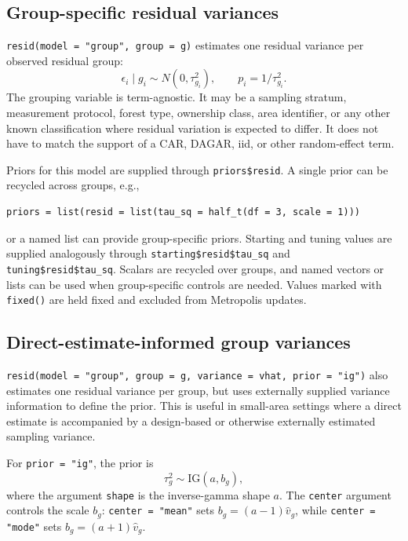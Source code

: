 \documentclass[11pt]{article}
\begin{document}
\subsection{Group-specific residual variances}

\texttt{resid(model = "group", group = g)} estimates one residual variance per observed residual group:
\begin{equation}
  \epsilon_i \mid g_i \sim N(0,\tau_{g_i}^2),
  \qquad p_i=1/\tau_{g_i}^2.
\end{equation}
The grouping variable is term-agnostic. It may be a sampling stratum, measurement protocol, forest type, ownership class, area identifier, or any other known classification where residual variation is expected to differ. It does not have to match the support of a CAR, DAGAR, iid, or other random-effect term.

Priors for this model are supplied through \texttt{priors\$resid}. A single prior can be recycled across groups, e.g.,
\begin{verbatim}
priors = list(resid = list(tau_sq = half_t(df = 3, scale = 1)))
\end{verbatim}
or a named list can provide group-specific priors. Starting and tuning values are supplied analogously through \texttt{starting\$resid\$tau\_sq} and \texttt{tuning\$resid\$tau\_sq}. Scalars are recycled over groups, and named vectors or lists can be used when group-specific controls are needed. Values marked with \texttt{fixed()} are held fixed and excluded from Metropolis updates.

\subsection{Direct-estimate-informed group variances}

\texttt{resid(model = "group", group = g, variance = vhat, prior = "ig")} also estimates one residual variance per group, but uses externally supplied variance information to define the prior. This is useful in small-area settings where a direct estimate is accompanied by a design-based or otherwise externally estimated sampling variance.

For \texttt{prior = "ig"}, the prior is
\begin{equation}
  \tau_g^2 \sim \mathrm{IG}(a, b_g),
\end{equation}
where the argument \texttt{shape} is the inverse-gamma shape $a$. The \texttt{center} argument controls the scale $b_g$: \texttt{center = "mean"} sets $b_g=(a-1)\widehat v_g$, while \texttt{center = "mode"} sets $b_g=(a+1)\widehat v_g$.
\end{document}
